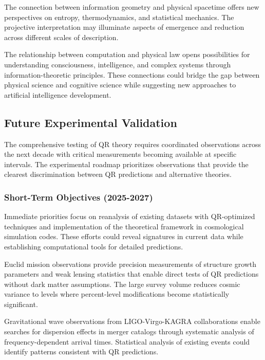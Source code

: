 The connection between information geometry and physical spacetime offers new perspectives on entropy, thermodynamics, and statistical mechanics. The projective interpretation may illuminate aspects of emergence and reduction across different scales of description.

The relationship between computation and physical law opens possibilities for understanding consciousness, intelligence, and complex systems through information-theoretic principles. These connections could bridge the gap between physical science and cognitive science while suggesting new approaches to artificial intelligence development.

\subsection{Future Experimental Validation}
\label{subsec:future-validation}

The comprehensive testing of QR theory requires coordinated observations across the next decade with critical measurements becoming available at specific intervals. The experimental roadmap prioritizes observations that provide the clearest discrimination between QR predictions and alternative theories.

\subsubsection{Short-Term Objectives (2025-2027)}
\label{subsubsec:short-term-objectives}

Immediate priorities focus on reanalysis of existing datasets with QR-optimized techniques and implementation of the theoretical framework in cosmological simulation codes. These efforts could reveal signatures in current data while establishing computational tools for detailed predictions.

Euclid mission observations provide precision measurements of structure growth parameters and weak lensing statistics that enable direct tests of QR predictions without dark matter assumptions. The large survey volume reduces cosmic variance to levels where percent-level modifications become statistically significant.

Gravitational wave observations from LIGO-Virgo-KAGRA collaborations enable searches for dispersion effects in merger catalogs through systematic analysis of frequency-dependent arrival times. Statistical analysis of existing events could identify patterns consistent with QR predictions.

